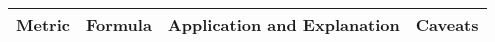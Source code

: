 \begin{sidewaystable}[]


\centering
\begin{tabularx}{\linewidth}{|X|X|X|X|}



\hline
Metric                                                                  & Formula                                                                                                                                                                                                                                                                                                                                                                                                                                                                                                                                                                                                                                                                                                                                                                                                                                                                                                         & Application and Explanation                                                                                                                                                                                                                                                                                                                                                                                                                    & Caveats                                                                                                                                                        \\ \hline

\end{tabularx}
\end{sidewaystable}
